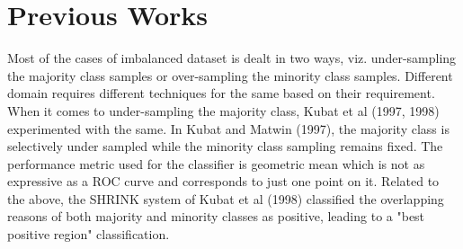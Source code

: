 \documentclass[10pt,journal,compsoc]{IEEEtran}
\begin{document}
%



\section{Previous Works}

Most of the cases of imbalanced dataset is dealt in two ways, viz. under-sampling the majority class samples or over-sampling the minority class samples.
Different domain requires different techniques for the same based on their requirement. 
When it comes to under-sampling the majority class, Kubat et al (1997, 1998) experimented with the same.
In Kubat and Matwin (1997), the majority class is selectively under sampled while the minority class sampling remains fixed. 
The performance metric used for the classifier is geometric mean which is not as expressive as a ROC curve and corresponds to just one point on it.
Related to the above, the SHRINK system of Kubat et al (1998) classified the overlapping reasons of both majority and minority classes as positive, leading to a "best positive region" classification.
 
\end{document}
